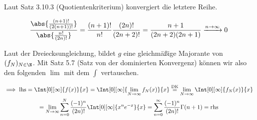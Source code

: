 \begin{solution}

Laut Satz 3.10.3 (Quotientenkriterium) konvergiert die letztere Reihe.

\begin{align*}
    \frac
    {
        \abs
        {
            \frac{(n + 1)!}{(2 (n + 1))!}
        }
    }{
        \abs
        {
            \frac{n!}{(2 n)!}
        }
    }
    =
    \frac{(n + 1)!}{n!}
    \frac{(2 n)!}{(2 n + 2)!}
    =
    \frac{n + 1}{(2 n + 2) (2 n + 1)}
    \xrightarrow{n \to \infty}
    0
\end{align*}


Laut der Dreiecksungleichung, bildet $g$ eine gleichmäßige Majorante von $(f_N)_{N \in \N}$.
Mit Satz 5.7 (Satz von der dominierten Konvergenz) können wir also den folgenden $\lim$ mit dem $\int$ vertauschen.

\begin{multline*}
    \implies
    \mathrm{lhs}
    =
    \Int[0][\infty]
    {
        f(x)
    }{x}
    =
    \Int[0][\infty]
    {
        \lim_{N \to \infty}
        f_N(x)
    }{x}
    \stackrel
    {
        \mathrm{DK}
    }{=}
    \lim_{N \to \infty}
    \Int[0][\infty]
    {
        f_N(x)
    }{x} \\
    =
    \lim_{N \to \infty}
    \sum_{n=0}^N
    \frac{(-1)^n}{(2 n)!}
    \Int[0][\infty]
    {
        x^n
        e^{-x}
    }{x}
    =
    \sum_{n=0}^\infty
    \frac{(-1)^n}{(2 n)!}
    \Gamma(n+1)
    =
    \mathrm{rhs}
\end{multline*}

\end{solution}

